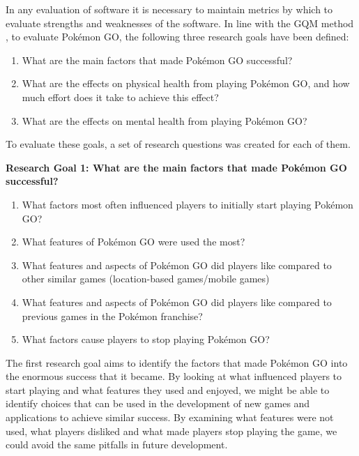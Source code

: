 
In any evaluation of software it is necessary to maintain metrics by which to evaluate strengths and weaknesses of the software. In line with the GQM method , to evaluate Pokémon GO, the following three research goals have been defined:

\begin{enumerate}
	\item What are the main factors that made Pokémon GO successful?
	\item What are the effects on physical health from playing Pokémon GO, and how much effort does it take to achieve this effect?
	\item What are the effects on mental health from playing Pokémon GO?
\end{enumerate}

To evaluate these goals, a set of research questions was created for each of them.

\textbf{Research Goal 1: What are the main factors that made Pokémon GO successful?}

\begin{enumerate}
	\item What factors most often influenced players to initially start playing Pokémon GO?
	\item What features of Pokémon GO were used the most?
	\item What features and aspects of Pokémon GO did players like compared to other similar games (location-based games/mobile games)
	\item What features and aspects of Pokémon GO did players like compared to previous games in the Pokémon franchise?
	\item What factors cause players to stop playing Pokémon GO?
\end{enumerate}

The first research goal aims to identify the factors that made Pokémon GO into the enormous success that it became. By looking at what influenced players to start playing and what features they used and enjoyed, we might be able to identify choices that can be used in the development of new games and applications to achieve similar success. By examining what features were not used, what players disliked and what made players stop playing the game, we could avoid the same pitfalls in future development.


